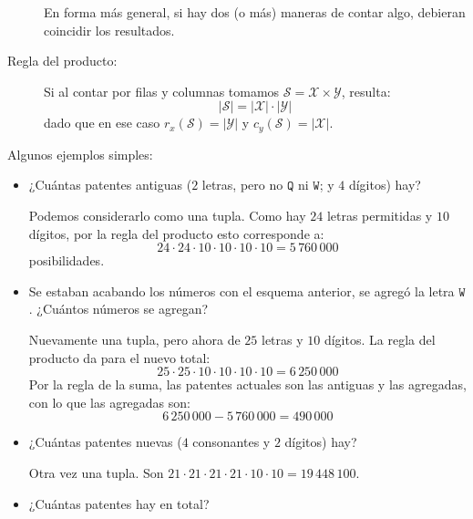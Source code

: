 \begin{description}
    En forma más general,
    si hay dos (o más) maneras de contar algo,
    debieran coincidir los resultados.
  \item[Regla del producto:]
    Si al contar por filas y columnas
    tomamos \(\mathcal{S} = \mathcal{X} \times \mathcal{Y}\),
    resulta:
    \begin{equation*}
      \lvert \mathcal{S} \rvert
	= \lvert \mathcal{X} \rvert
	    \cdot \lvert \mathcal{Y} \rvert
    \end{equation*}
    dado que en ese caso
    \(r_x(\mathcal{S}) = \lvert \mathcal{Y} \rvert \)
    y \(c_y(\mathcal{S}) = \lvert \mathcal{X} \rvert\).
  \end{description}

  Algunos ejemplos simples:
  \begin{itemize}
  \item
    ¿Cuántas patentes antiguas
    (\(2\) letras, pero no \(\mathtt{Q}\) ni \(\mathtt{W}\);
    y \(4\) dígitos)
    hay?

    Podemos considerarlo como una tupla.
    Como hay \(24\) letras permitidas y \(10\) dígitos,
    por la regla del producto esto corresponde a:
    \begin{equation*}
      24 \cdot 24 \cdot 10 \cdot 10 \cdot 10 \cdot 10
	= 5\,760\,000
    \end{equation*}
    posibilidades.
  \item
    Se estaban acabando los números con el esquema anterior,
    se agregó la letra \(\mathtt{W}\).
    ¿Cuántos números se agregan?

    Nuevamente una tupla,
    pero ahora de \(25\) letras y \(10\) dígitos.
    La regla del producto da para el nuevo total:
    \begin{equation*}
      25 \cdot 25 \cdot 10 \cdot 10 \cdot 10 \cdot 10
	= 6\,250\,000
    \end{equation*}
    Por la regla de la suma,
    las patentes actuales son las antiguas y las agregadas,
    con lo que las agregadas son:
    \begin{equation*}
      6\,250\,000 - 5\,760\,000
	= 490\,000
    \end{equation*}
  \item
    ¿Cuántas patentes nuevas
    (\(4\) consonantes y \(2\) dígitos)
    hay?

    Otra vez una tupla.
    Son \(21 \cdot 21 \cdot 21 \cdot 21 \cdot 10 \cdot 10
	    = 19\,448\,100\).
  \item
    ¿Cuántas patentes hay en total?


\end{itemize}
